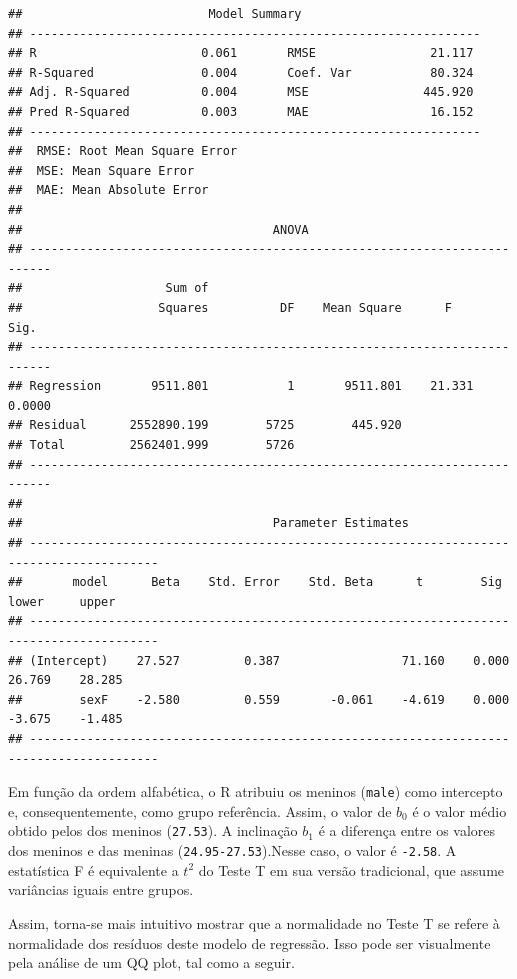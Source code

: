 \documentclass[
]{book}
\begin{document}
\begin{verbatim}
##                          Model Summary                          
## ---------------------------------------------------------------
## R                       0.061       RMSE                21.117 
## R-Squared               0.004       Coef. Var           80.324 
## Adj. R-Squared          0.004       MSE                445.920 
## Pred R-Squared          0.003       MAE                 16.152 
## ---------------------------------------------------------------
##  RMSE: Root Mean Square Error 
##  MSE: Mean Square Error 
##  MAE: Mean Absolute Error 
## 
##                                   ANOVA                                   
## -------------------------------------------------------------------------
##                    Sum of                                                
##                   Squares          DF    Mean Square      F         Sig. 
## -------------------------------------------------------------------------
## Regression       9511.801           1       9511.801    21.331    0.0000 
## Residual      2552890.199        5725        445.920                     
## Total         2562401.999        5726                                    
## -------------------------------------------------------------------------
## 
##                                   Parameter Estimates                                    
## ----------------------------------------------------------------------------------------
##       model      Beta    Std. Error    Std. Beta      t        Sig      lower     upper 
## ----------------------------------------------------------------------------------------
## (Intercept)    27.527         0.387                 71.160    0.000    26.769    28.285 
##        sexF    -2.580         0.559       -0.061    -4.619    0.000    -3.675    -1.485 
## ----------------------------------------------------------------------------------------
\end{verbatim}

Em função da ordem alfabética, o R atribuiu os meninos (\texttt{male}) como intercepto e, consequentemente, como grupo referência. Assim, o valor de \(b_0\) é o valor médio obtido pelos dos meninos (\texttt{27.53}). A inclinação \(b_1\) é a diferença entre os valores dos meninos e das meninas (\texttt{24.95-27.53}).Nesse caso, o valor é \texttt{-2.58}. A estatística F é equivalente a \(t^2\) do Teste T em sua versão tradicional, que assume variâncias iguais entre grupos.

Assim, torna-se mais intuitivo mostrar que a normalidade no Teste T se refere à normalidade dos resíduos deste modelo de regressão. Isso pode ser visualmente pela análise de um QQ plot, tal como a seguir.
\end{document}
